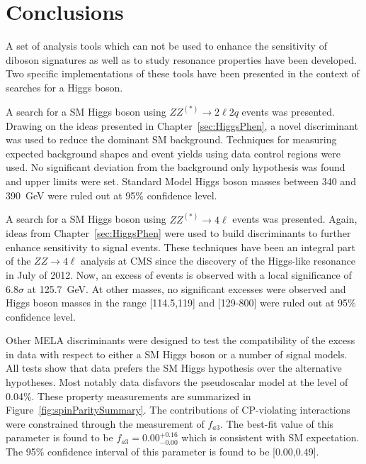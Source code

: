 \chapter{Conclusions}
\label{sec:Conclusions}

A set of analysis tools which can not be used to enhance the
sensitivity of diboson signatures as well as to study resonance
properties have been developed.  Two specific implementations 
of these tools have been presented in the context of searches
for a Higgs boson. 

A search for a SM Higgs boson using $ZZ^{(*)}\to2\ell2q$ events
was presented.  
Drawing on the ideas presented in Chapter~\ref{sec:HiggsPhen},
a novel discriminant was used to reduce the dominant SM
background. 
Techniques for measuring expected background
shapes and event yields using data control regions were used.
No significant deviation from the background 
only hypothesis was found and upper limits were set.
Standard Model Higgs boson masses between 340 and 390~GeV
were ruled out at 95\% confidence level.

A search for a SM Higgs boson using $ZZ^{(*)}\to4\ell$ events
was presented.  Again, ideas from Chapter~\ref{sec:HiggsPhen} 
were used to build discriminants to further enhance sensitivity
to signal events.  These techniques have been an integral part
of the $ZZ\to4\ell$ analysis at CMS since the discovery of the 
Higgs-like resonance in July of 2012.  
Now, an excess of events is observed with a local significance
of $6.8\sigma$ at 125.7~GeV.  
At other masses, no significant excesses were observed 
and Higgs boson masses in the range [114.5,119] and [129-800]
were ruled out at 95\% confidence level. 

Other MELA discriminants were designed to test the
compatibility of the excess in data with respect to either
a SM Higgs boson or a number of signal models.  All 
tests show that data prefers the SM Higgs hypothesis over
the alternative hypotheses.  Most notably data disfavors the 
pseudoscalar model at the level of 0.04\%.  These property
measurements are summarized in Figure~\ref{fig:spinParitySummary}.
The contributions of CP-violating 
interactions were constrained through the measurement of $f_{a3}$.
The best-fit value of this parameter is found to be 
$f_{a3}=0.00^{+0.16}_{-0.00}$ which is consistent with SM expectation.  The 95\% confidence interval of this parameter is found to be 
[0.00,0.49].

